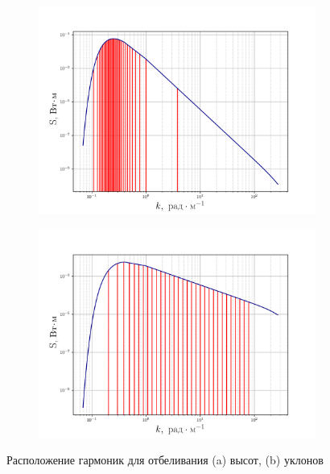 \begin{figure}[h!]
    \begin{subfigure}{0.49\linewidth}
        \includegraphics[width=\linewidth]{fig/fig1}
        \caption{}
    \end{subfigure}
    \begin{subfigure}{0.49\linewidth}
        \includegraphics[width=\linewidth]{fig/fig2}
        \caption{}
    \end{subfigure}
    \caption{Расположение гармоник для отбеливания (a) высот, (b) уклонов}
    \label{fig:13}
\end{figure}

